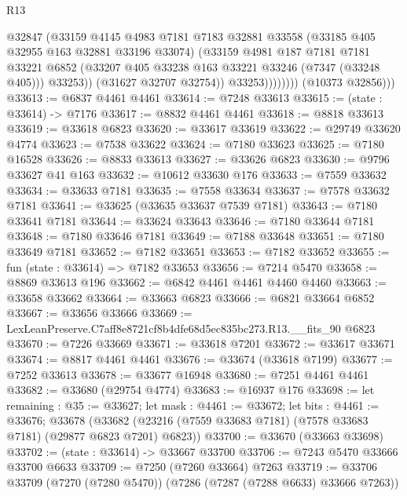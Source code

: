 \begin{lexlean}{R13}
\begin{coremodule}
                          @32847
                          (@33159
                            @4145
                            @4983
                            @7181
                            @7183
                            @32881
                            @33558
                            (@33185 @405 @32955 @163 @32881 @33196 @33074)
                            (@33159
                              @4981
                              @187
                              @7181
                              @7181
                              @33221
                              @6852
                              (@33207 @405 @33238 @163 @33221 @33246 (@7347 (@33248 @405)))
                              @33253))
                          (@31627 @32707 @32754))
                        @33253))))))))
        (@10373 @32856)))
@33613 := @6837 @4461 @4461
@33614 := @7248 @33613
@33615 := (state : @33614) -> @7176
@33617 := @8832 @4461 @4461
@33618 := @8818 @33613
@33619 := @33618 @6823
@33620 := @33617 @33619
@33622 := @29749 @33620 @4774
@33623 := @7538 @33622
@33624 := @7180 @33623
@33625 := @7180 @16528
@33626 := @8833 @33613
@33627 := @33626 @6823
@33630 := @9796 @33627 @41 @163
@33632 := @10612 @33630 @176
@33633 := @7559 @33632
@33634 := @33633 @7181
@33635 := @7558 @33634
@33637 := @7578 @33632 @7181
@33641 := @33625 (@33635 @33637 @7539 @7181)
@33643 := @7180 @33641 @7181
@33644 := @33624 @33643
@33646 := @7180 @33644 @7181
@33648 := @7180 @33646 @7181
@33649 := @7188 @33648
@33651 := @7180 @33649 @7181
@33652 := @7182 @33651
@33653 := @7182 @33652
@33655 := fun (state : @33614) => @7182 @33653
@33656 := @7214 @5470
@33658 := @8869 @33613 @196
@33662 := @6842 @4461 @4461 @4460 @4460
@33663 := @33658 @33662
@33664 := @33663 @6823
@33666 := @6821 @33664 @6852
@33667 := @33656 @33666
@33669 := LexLeanPreserve.C7aff8e8721cf8b4dfe68d5ec835bc273.R13.__fits_90 @6823
@33670 := @7226 @33669
@33671 := @33618 @7201
@33672 := @33617 @33671
@33674 := @8817 @4461 @4461
@33676 := @33674 (@33618 @7199)
@33677 := @7252 @33613
@33678 := @33677 @16948
@33680 := @7251 @4461 @4461
@33682 := @33680 (@29754 @4774)
@33683 := @16937 @176
@33698 := let remaining : @35 := @33627;
  let mask : @4461 := @33672;
  let bits : @4461 := @33676;
  @33678 (@33682 (@23216 (@7559 @33683 @7181) (@7578 @33683 @7181) (@29877 @6823 @7201) @6823))
@33700 := @33670 (@33663 @33698)
@33702 := (state : @33614) -> @33667 @33700
@33706 := @7243 @5470 @33666 @33700 @6633
@33709 := @7250 (@7260 @33664) @7263
@33719 := @33706 @33709 (@7270 (@7280 @5470)) (@7286 (@7287 (@7288 @6633) @33666 @7263))

\end{coremodule}
\end{lexlean}

